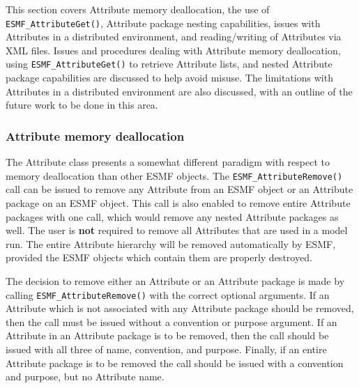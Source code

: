 %

This section covers Attribute memory deallocation, the use of {\tt ESMF\_AttributeGet()}, Attribute package nesting capabilities, issues with Attributes in a distributed environment, and reading/writing of Attributes via XML files.  Issues and procedures dealing with Attribute memory deallocation, using {\tt ESMF\_AttributeGet()} to retrieve Attribute lists, and nested Attribute package capabilities are discussed to help avoid misuse.  The limitations with Attributes in a distributed environment are also discussed, with an outline of the future work to be done in this area. 

\subsubsection{Attribute memory deallocation}

The Attribute class presents a somewhat different paradigm with respect to memory deallocation than other ESMF objects.  The {\tt ESMF\_AttributeRemove()} call can be issued to remove any Attribute from an ESMF object or an Attribute package on an ESMF object.  This call is also enabled to remove entire Attribute packages with one call, which would remove any nested Attribute packages as well.  The user is {\bf not} required to remove all Attributes that are used in a model run.  The entire Attribute hierarchy will be removed automatically by ESMF, provided the ESMF objects which contain them are properly destroyed.  

The decision to remove either an Attribute or an Attribute package is made by calling {\tt ESMF\_AttributeRemove()} with the correct optional arguments.  If an Attribute which is not associated with any Attribute package should be removed, then the call must be issued without a convention or purpose argument.  If an Attribute in an Attribute package is to be removed, then the call should be issued with all three of name, convention, and purpose.  Finally, if an entire Attribute package is to be removed the call should be issued with a convention and purpose, but no Attribute name.

